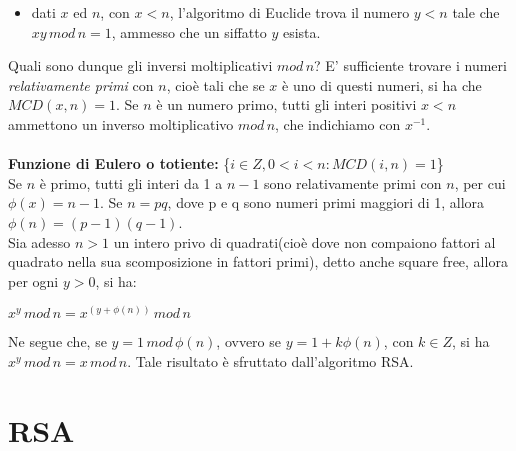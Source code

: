 \begin{itemize}
\item dati $x$ ed $n$, con $x<n$, l'algoritmo di Euclide trova il numero $y<n$ tale che $xy \, mod \, n = 1$, ammesso che un siffatto $y$ esista.
\end{itemize} 
Quali sono dunque gli inversi moltiplicativi $mod \, n$? E' sufficiente trovare i numeri \textit{relativamente primi} con $n$, cioè tali che se $x$ è uno di questi numeri, si ha che $MCD(x,n) = 1$. Se $n$ è un numero primo, tutti gli interi positivi $x<n$ ammettono un inverso moltiplicativo $mod \, n$, che indichiamo con $x^{-1}$.\\ \\
\textbf{Funzione di Eulero o totiente:} \{$i \in Z, 0 < i < n: MCD(i,n) = 1$\} \\

Se $n$ è primo, tutti gli interi da 1 a $n-1$ sono relativamente primi con $n$, per cui $\phi(x) = n - 1$. Se $n = pq$, dove p e q sono numeri primi maggiori di 1, allora $\phi(n) = (p-1)(q-1)$. \\
Sia adesso $n > 1$ un intero privo di quadrati(cioè dove non compaiono fattori al quadrato nella sua scomposizione in fattori primi), detto anche square free, allora per ogni $y > 0$, si ha: \begin{center}
$x^y \, mod \, n = x^{(y + \phi(n) )} \, mod \, n$
\end{center} Ne segue che, se $ y = 1 \, mod \, \phi(n) $, ovvero se $y = 1 + k \phi(n) $, con $k \in Z$, si ha $x^y \, mod \, n = x \, mod \, n $. Tale risultato è sfruttato dall'algoritmo RSA.

\section{RSA}

